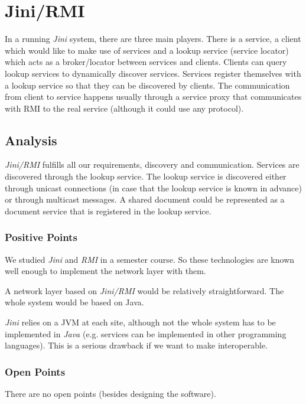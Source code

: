 \section{Jini/RMI}
In a running \emph{Jini} system, there are three main players. There is a service, a client which would like to make use of services and a lookup service (service locator) which acts as a broker/locator between services and clients. Clients can query lookup services to dynamically discover services. Services register themselves with a lookup service so that they can be discovered by clients. The communication from client to service happens usually through a service proxy that communicates with RMI to the real service (although it could use any protocol).



\subsection{Analysis}
\emph{Jini/RMI} fulfills all our requirements, discovery and communication. Services are discovered through the lookup service. The lookup service is discovered either through unicast connections (in case that the lookup service is known in advance) or through multicast messages. A shared document could be represented as a document service that is registered in the lookup service.

\subsubsection{Positive Points}
We studied \emph{Jini} and \emph{RMI} in a semester course. So these technologies are known well enough to implement the network layer with them.

A network layer based on \emph{Jini/RMI} would be relatively straightforward. The whole system would be based on Java.

\emph{Jini} relies on a JVM at each site, although not the whole system has to be implemented in \emph{Java} (e.g. services can be implemented in other programming languages). This is a serious drawback if we want to make \ace interoperable.

\subsubsection{Open Points}
There are no open points (besides designing the software).

